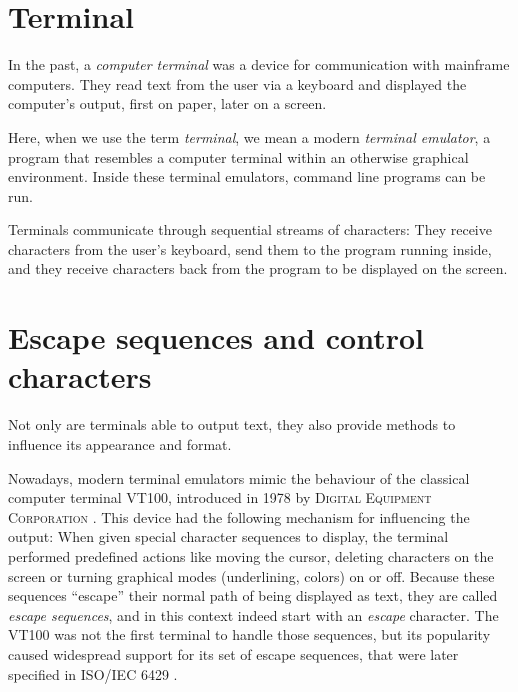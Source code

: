 \documentclass[paper=a4,twoside,abstract=on,cleardoublepage=empty,numbers=noenddot,toc=bib,12pt,appendixprefix=true]{scrreprt}
\begin{document}
\section{Terminal}

In the past, a \emph{computer terminal} was a device for communication with mainframe computers. They read text from the user via a keyboard and displayed the computer's output, first on paper, later on a screen.

Here, when we use the term \emph{terminal}, we mean a modern \emph{terminal emulator}, a program that resembles a computer terminal within an otherwise graphical environment. Inside these terminal emulators, command line programs can be run.

Terminals communicate through sequential streams of characters: They receive characters from the user's keyboard, send them to the program running inside, and they receive characters back from the program to be displayed on the screen.

\section{Escape sequences and control characters}

Not only are terminals able to output text, they also provide methods to influence its appearance and format.

Nowadays, modern terminal emulators mimic the behaviour of the classical computer terminal \textsc{VT100}, introduced in 1978 by \textsc{Digital Equipment Corporation} \cite{upt02}. This device had the following mechanism for influencing the output: When given special character sequences to display, the terminal performed predefined actions like moving the cursor, deleting characters on the screen or turning graphical modes (underlining, colors) on or off. Because these sequences “escape” their normal path of being displayed as text, they are called \emph{escape sequences}, and in this context indeed start with an \emph{escape} character. The \textsc{VT100} was not the first terminal to handle those sequences, but its popularity caused widespread support for its set of escape sequences, that were later specified in \textsc{ISO}/\textsc{IEC} 6429 \cite{iso6429}.
\end{document}
